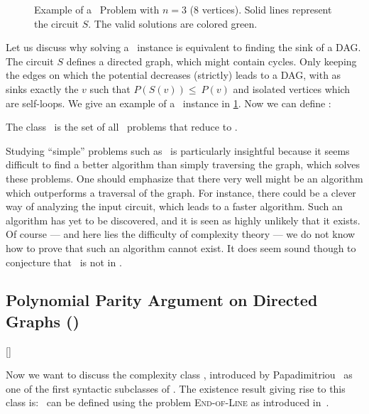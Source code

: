 
\begin{figure}
	\centering
	\caption[Example of a \Localopt\ Problem]{Example of a \Localopt\ Problem with $n=3$ (8 vertices). Solid lines represent the circuit $S$. The valid solutions are colored green.}\label{fig:localopt_example}
\end{figure}

Let us discuss why solving a \Localopt\ instance is equivalent to finding the sink of a DAG\@. The circuit $S$ defines a directed graph, which might contain cycles. Only keeping the edges on which the potential decreases (strictly) leads to a DAG, with as sinks exactly the $v$ such that $P(S(v)) \leq\ P(v)$ and isolated vertices which are self-loops. We give an example of a \Localopt\ instance in \cref{fig:localopt_example}. Now we can define \PLS\@:

\begin{definition}
	The class \PLS\ is the set of all \TFNP\ problems that reduce to \Localopt.
\end{definition}

Studying ``simple'' problems such as \Localopt\ is particularly insightful because it seems difficult to find a better algorithm than simply traversing the graph, which solves these problems. One should emphasize that there very well might be an algorithm which outperforms a traversal of the graph. For instance, there could be a clever way of analyzing the input circuit, which leads to a faster algorithm. Such an algorithm has yet to be discovered, and it is seen as highly unlikely that it exists. Of course --- and here lies the difficulty of complexity theory --- we do not know how to prove that such an algorithm cannot exist. It does seem sound though to conjecture that \PLS\ is not in \FP\@.

\subsection{Polynomial Parity Argument on Directed Graphs (\PPAD)}[\PPAD]

Now we want to discuss the complexity class \PPAD, introduced by Papadimitriou~ as one of the first syntactic subclasses of \TFNP\@. The existence result giving rise to this class is: 
\PPAD\ can be defined using the problem \textsc{End-of-Line} as introduced in~.

